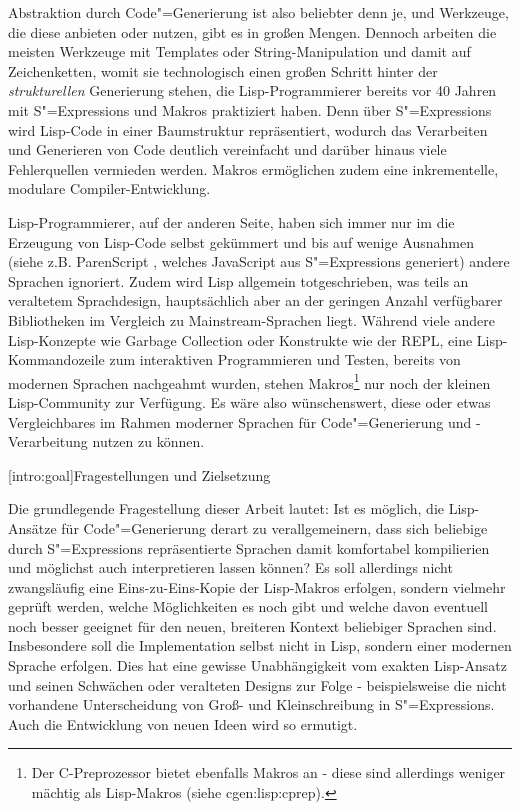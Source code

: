 \documentclass[a4paper, bibgerm]{book}
\newcommand\lsection{}
\newcommand\sref{}
\newcommand{\sees}[1]{(siehe \sref{#1})}
\newcommand{\sexps}{S"=Expressions}
\newcommand{\cgen}{Code"=Generierung}
\begin{document}
Abstraktion durch \cgen{} ist also beliebter denn je, und
Werkzeuge, die diese anbieten oder nutzen, gibt es in großen
Mengen. Dennoch arbeiten die meisten Werkzeuge mit Templates oder
String-Manipulation und damit auf Zeichenketten, womit sie
technologisch einen großen Schritt hinter der \textit{strukturellen}
Generierung stehen, die Lisp-Programmierer bereits vor 40 Jahren mit
\sexps{} und Makros praktiziert haben. Denn über \sexps{} wird Lisp-Code
in einer Baumstruktur repräsentiert, wodurch das Verarbeiten
und Generieren von Code deutlich vereinfacht und darüber hinaus viele
Fehlerquellen vermieden werden. Makros ermöglichen zudem eine
inkrementelle, modulare Compiler-Entwicklung.

Lisp-Programmierer, auf der anderen Seite, haben sich immer nur im die
Erzeugung von Lisp-Code selbst gekümmert und bis auf wenige Ausnahmen
(siehe z.B. ParenScript \cite{TODO}, welches JavaScript aus \sexps{}
generiert) andere Sprachen ignoriert. Zudem wird Lisp allgemein
totgeschrieben, was teils an veraltetem Sprachdesign, hauptsächlich
aber an der geringen Anzahl verfügbarer Bibliotheken im Vergleich zu
Mainstream-Sprachen liegt. Während viele andere Lisp-Konzepte wie
Garbage Collection oder Konstrukte wie der REPL, eine
Lisp-Kommandozeile zum interaktiven Programmieren und Testen, bereits
von modernen Sprachen nachgeahmt wurden, stehen Makros\footnote{Der
  C-Preprozessor bietet ebenfalls Makros an - diese sind allerdings
  weniger mächtig als Lisp-Makros \sees{cgen:lisp:cprep}.} nur noch
der kleinen Lisp-Community zur Verfügung. Es wäre also wünschenswert,
diese oder etwas Vergleichbares im Rahmen moderner Sprachen für
\cgen{} und -Verarbeitung nutzen zu können.

\lsection[intro:goal]{Fragestellungen und Zielsetzung}

Die grundlegende Fragestellung dieser Arbeit lautet: Ist es möglich, die
Lisp-Ansätze für \cgen{} derart zu verallgemeinern, dass sich
beliebige durch \sexps{} repräsentierte Sprachen damit komfortabel
kompilierien und möglichst auch interpretieren lassen können? Es soll
allerdings nicht zwangsläufig eine Eins-zu-Eins-Kopie der Lisp-Makros
erfolgen, sondern vielmehr geprüft werden, welche Möglichkeiten es noch
gibt und welche davon eventuell noch besser geeignet für den neuen,
breiteren Kontext beliebiger Sprachen sind. Insbesondere soll die
Implementation selbst nicht in Lisp, sondern einer modernen Sprache
erfolgen. Dies hat eine gewisse Unabhängigkeit vom exakten Lisp-Ansatz
und seinen Schwächen oder veralteten Designs zur Folge -
beispielsweise die nicht vorhandene Unterscheidung von Groß- und
Kleinschreibung in \sexps{}. Auch die Entwicklung von neuen Ideen wird
so ermutigt.
\end{document}
